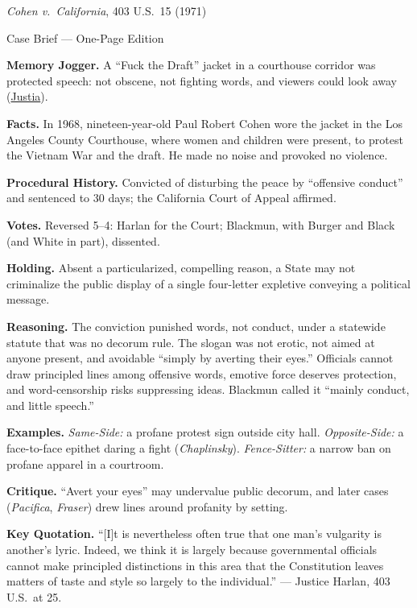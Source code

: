 \documentclass[12pt]{article}
\begin{document}
\begin{center}
{\Large \textit{Cohen v.\ California}, 403 U.S.\ 15 (1971)\par}
\vspace{0.3em}
{\normalsize Case Brief --- One-Page Edition\par}
\end{center}

\textbf{Memory Jogger.} A ``Fuck the Draft'' jacket in a courthouse corridor was protected speech: not obscene, not fighting words, and viewers could look away (\href{https://supreme.justia.com/cases/federal/us/403/15/}{Justia}).

\textbf{Facts.} In 1968, nineteen-year-old Paul Robert Cohen wore the jacket in the Los Angeles County Courthouse, where women and children were present, to protest the Vietnam War and the draft. He made no noise and provoked no violence.

\textbf{Procedural History.} Convicted of disturbing the peace by ``offensive conduct'' and sentenced to 30 days; the California Court of Appeal affirmed.

\textbf{Votes.} Reversed 5--4: Harlan for the Court; Blackmun, with Burger and Black (and White in part), dissented.

\textbf{Holding.} Absent a particularized, compelling reason, a State may not criminalize the public display of a single four-letter expletive conveying a political message.

\textbf{Reasoning.} The conviction punished words, not conduct, under a statewide statute that was no decorum rule. The slogan was not erotic, not aimed at anyone present, and avoidable ``simply by averting their eyes.'' Officials cannot draw principled lines among offensive words, emotive force deserves protection, and word-censorship risks suppressing ideas. Blackmun called it ``mainly conduct, and little speech.''

\textbf{Examples.} \emph{Same-Side:} a profane protest sign outside city hall. \emph{Opposite-Side:} a face-to-face epithet daring a fight (\textit{Chaplinsky}). \emph{Fence-Sitter:} a narrow ban on profane apparel in a courtroom.

\textbf{Critique.} ``Avert your eyes'' may undervalue public decorum, and later cases (\textit{Pacifica}, \textit{Fraser}) drew lines around profanity by setting.

\textbf{Key Quotation.} ``[I]t is nevertheless often true that one man's vulgarity is another's lyric. Indeed, we think it is largely because governmental officials cannot make principled distinctions in this area that the Constitution leaves matters of taste and style so largely to the individual.'' --- Justice Harlan, 403 U.S.\ at 25.
\end{document}

